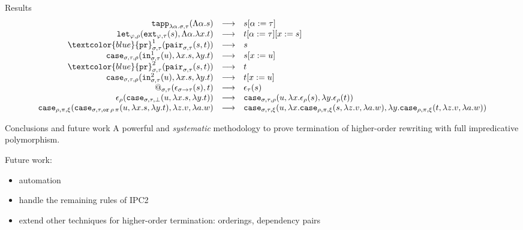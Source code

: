 \documentclass[10pt,presentation,color=names]{beamer}
\newcommand{\arrtype}{\rightarrow}
\newcommand{\abs}[2]{\lambda #1.#2}
\newcommand{\tabs}[2]{\Lambda #1.#2}
\newcommand{\red}{\longrightarrow}
\newcommand{\symb}[1]{\textcolor{blue}{\mathtt{#1}}}
\newcommand{\proj}{\symb{pr}}
\begin{document}
\begin{frame}{Results}
\[\begin{array}{rcl}
\mathtt{tapp}_{\abs{\alpha}{\sigma},\tau}(\tabs{\alpha}{s}) & \red &
  s[\alpha:=\tau] \\
\mathtt{let}_{\varphi,\rho}(\mathtt{ext}_{\varphi,\tau}(s),\tabs{\alpha}{\abs{x}{t}}) & \red & t[\alpha:=\tau][x:=s] \\

\proj^1_{\sigma,\tau}(\mathtt{pair}_{\sigma,\tau}(s,t)) & \red & s \\
\!\!\!\!\!\!\!
\mathtt{case}_{\sigma,\tau,\rho}(\mathtt{in}^1_{\sigma,\tau}(u),
  \abs{x}{s},\abs{y}{t}) & \red & s[x:=u] \\

\proj^2_{\sigma,\tau}(\mathtt{pair}_{\sigma,\tau}(s,t)) & \red & t  \\
\!\!\!\!\!\!\!
\mathtt{case}_{\sigma,\tau,\rho}(\mathtt{in}^2_{\sigma,\tau}(u),
  \abs{x}{s},\abs{y}{t}) & \red & t[x:=u] \\
@_{\sigma,\tau}(\epsilon_{\sigma \arrtype \tau}(s),t) &\red&
  \epsilon_\tau(s) \\
\epsilon_\rho(\mathtt{case}_{\sigma,\tau,\bot}(u,\abs{x}{s},
  \abs{y}{t})) &\red&
  \mathtt{case}_{\sigma,\tau,\rho}(u,\abs{x}{\epsilon_\rho(s)},
  \abs{y}{\epsilon_\rho(t)}) \\
\mathtt{case}_{\rho,\pi,\xi}(\mathtt{case}_{\sigma,\tau,\mathtt{or}\,
  \rho\,\pi}(u,\abs{x}{s},\abs{y}{t}),\abs{z}{v},
  \abs{a}{w}) &\red&
  \mathtt{case}_{\sigma,\tau,\xi}(u,\abs{x}{\mathtt{case}_{
  \rho,\pi,\xi}(s,\abs{z}{v},\abs{a}{w})},
  \abs{y}{\mathtt{case}_{\rho,\pi,\xi}(t,\abs{z}{v},
  \abs{a}{w})})
\end{array}
\]
\end{frame}

\begin{frame}{Conclusions and future work}
  A powerful and \emph{systematic} methodology to prove termination of
  higher-order rewriting with full impredicative polymorphism.\pause

  \bigskip
  Future work:
  \begin{itemize}
  \item automation\pause
  \item handle the remaining rules of IPC2\pause
  \item extend other techniques for higher-order termination:
    orderings, dependency pairs
  \end{itemize}
\end{frame}
\end{document}
